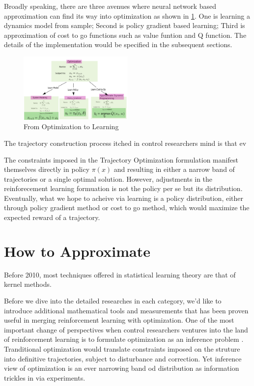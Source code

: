 \documentclass[journal]{IEEEtran}
\begin{document}
Broadly speaking, there are three avenues where neural network based approximation can find its way into optimization as shown in \ref{fig:1}. One is learning a dynamics model from sample; Second is policy gradient based learning; Third is approximation of cost to go functions such as value funtion and Q function. The details of the implementation would be specified in the subsequent sections.

\begin{figure}[H]
    \centering
    \includegraphics[width=0.5\textwidth]{Control.png}
    \caption{From Optimization to Learning}
    \label{fig:1}
\end{figure}

The trajectory construction process itched in control researchers mind is that ev

The constraints imposed in the Trajectory Optimization formulation manifest themselves directly in policy $\pi(x)$ and resulting in either a narrow band of trajectories or a single optimal solution. However, adjustments in the reinforecement learning formuation is not the policy per se but its distribution. Eventually, what we hope to acheive via learning is a policy distribution, either through policy gradient method or cost to go method, which would maximize the expected reward of a trajectory.

\section{How to Approximate}
Before 2010, most techniques offered in statistical learning theory are that of kernel methods.

Before we dive into the detailed researches in each category, we'd like to introduce additional mathematical tools and measurements that has been proven useful in merging reinforcement learning with optimization. One of the most important change of perspectives when control researchers ventures into the land of reinforcement learning is to formulate optimization as an inference problem \cite{Levine2018ReinforcementLA}. Tranditional optimization would translate constraints imposed on the struture into definitive trajectories, subject to disturbance and correction. Yet inference view of optimization is an ever narrowing band od distribution as information trickles in via experiments.
\end{document}
